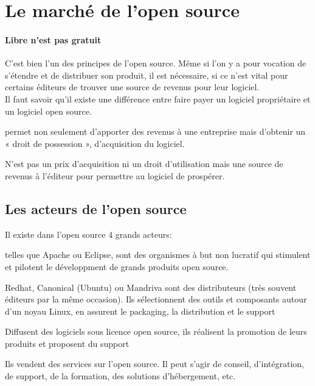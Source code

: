
	\section{Le marché de l'open source} %

		\paragraph{Libre n'est pas gratuit \\} 

			C'est bien l'un des principes de l'open source. Même si l'on y a pour vocation de s'étendre et de distribuer son produit, il est nécessaire, si ce n'est vital pour certains éditeurs de trouver une source de revenus pour leur logiciel.\\
			Il faut savoir qu'il existe une différence entre faire payer un logiciel propriétaire et un logiciel open source. 
			\begin{description}[font=\color{burntorange}]
				\item [Payer un logiciel propriétaire: ] permet non seulement d'apporter des revenus à une entreprise mais d'obtenir un « droit de possession », d'acquisition du logiciel.
				\item [Payer un logiciel open source: ] N'est pas un prix d'acquisition ni un droit d'utilisation mais une source de revenus à l'éditeur pour permettre au logiciel de prospérer.
			\end{description}

		\subsection{Les acteurs de l'open source}
			Il existe dans l'open source 4 grands acteurs:

			\begin{description}[font=\color{burntorange}]
				\item[Les fondations:] telles que Apache ou Eclipse, sont des organismes à but non lucratif qui stimulent et pilotent le développment de grands produits open source.
				\item[Les distributeurs:] Redhat, Canonical (Ubuntu) ou Mandriva sont des distributeurs (très souvent éditeurs par la même occasion). Ils sélectionnent des outils et composants autour d'un noyau Linux, en assurent le packaging, la distribution et le support
				\item[Les éditeurs:] Diffusent des logiciels sous licence open source, ils réalisent la promotion de leurs produits et proposent du support
				\item[Les prestataires: ] Ils vendent des services sur l'open source. Il peut s'agir de conseil, d'intégration, de support, de la formation, des solutions d'hébergement, etc.
			\end{description}

